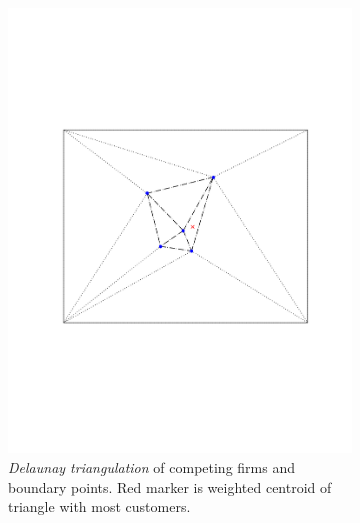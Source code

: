 \documentclass[preprint, 12pt]{elsarticle}
\begin{document}
\begin{figure}
\begin{subfigure}[t]{0.31\textwidth}
		\includegraphics[width=\textwidth, trim={34mm 76mm 28mm 76mm}]{Graphics/maxcov_b_delaunay.pdf}
		\caption{\emph{Delaunay triangulation} of competing firms and boundary points. Red marker is weighted centroid of triangle with most customers.}
		\label{fig:maxcov_delaunay}
	\end{subfigure}
	~
	\begin{subfigure}[t]{0.31\textwidth}

\end{subfigure}
\end{figure}
\end{document}
